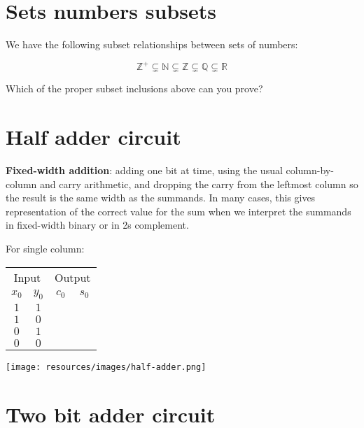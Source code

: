 \documentclass[12pt, oneside]{article}
\begin{document}
\begin{flushright}
\end{flushright} \section*{Sets numbers subsets}


We have the following subset relationships between sets of numbers:

\[
    \mathbb{Z}^{+} \subsetneq \mathbb{N} \subsetneq \mathbb{Z} \subsetneq \mathbb{Q} \subsetneq \mathbb{R}
\]


Which of the proper subset inclusions above can you prove?

\vspace{50pt} \vfill
\section*{Half adder circuit}


{\bf Fixed-width addition}: adding one bit at time, using the usual column-by-column and carry arithmetic, and dropping the carry from the leftmost column so the result is the same width as the summands.  In many cases, this gives representation of the correct value for the sum when we interpret the summands
in fixed-width binary or in 2s complement.

For single column:

\begin{multicols}{2}
\begin{center}
\begin{tabular}{cc|cc}
\multicolumn{2}{c|}{Input}  & \multicolumn{2}{|c}{Output}  \\
$x_0$ & $y_0$ & $c_0$ & $s_0$  \\
\hline
$1$ & $1$ & \phantom{$1$} & \phantom{$0$} \\
$1$ & $0$ & \phantom{$0$} & \phantom{$1$}\\
$0$ & $1$ & \phantom{$0$} & \phantom{$1$}\\
$0$ & $0$ & \phantom{$0$} & \phantom{$0$}\\
\end{tabular}
\end{center}
\columnbreak
\begin{center}
\texttt{[image: resources/images/half-adder.png]}
\end{center}
\end{multicols} \vfill
\section*{Two bit adder circuit}
\end{document}
